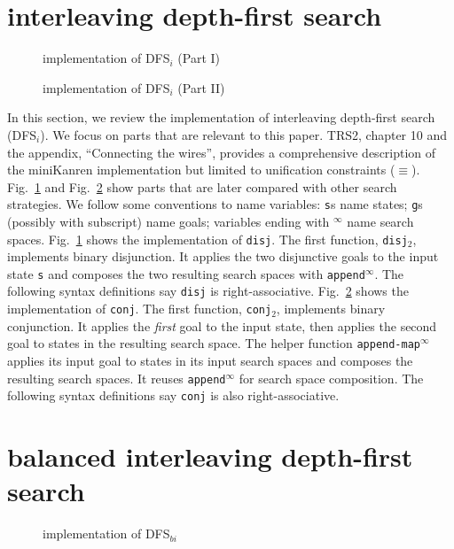 \documentclass[format=acmlarge, review=true, authordraft=true]{acmart}
\newcommand{\conj}{\texttt{conj}}
\newcommand{\disj}{\texttt{disj}}
\newcommand{\disjtwo}{\texttt{disj$_2$}}
\newcommand{\conjtwo}{\texttt{conj$_2$}}
\newcommand{\DFSi }[0]{DFS$_{i}$}
\newcommand{\DFSbi}[0]{DFS$_{bi}$}
\begin{document}
\section{interleaving depth-first search}

\begin{figure}
	
	\caption{implementation of \DFSi{} (Part I)}
	\label{DFSi-0}
\end{figure}

\begin{figure}
	
	\caption{implementation of \DFSi{} (Part II)}
	\label{DFSi-1}
\end{figure}

In this section, we review the implementation of interleaving depth-first 
search (\DFSi). We focus on parts that are relevant to this paper. TRS2,
chapter 10 and the appendix, ``Connecting the wires'', 
provides a comprehensive description of the 
miniKanren 
implementation but limited to unification constraints ($\equiv$).
Fig.~\ref{DFSi-0} and Fig.~\ref{DFSi-1} show parts that are later compared 
with other search 
strategies. We follow some conventions to name variables: \texttt{s}s name 
states; \texttt{g}s (possibly with subscript) name goals; 
variables ending with $^\infty$ name search spaces. Fig.~\ref{DFSi-0} shows the 
implementation of \disj. The 
first function, \disjtwo, implements binary disjunction. It applies the 
two disjunctive goals to the input state \texttt{s} and composes the two 
resulting search spaces with \texttt{append$^\infty$}. The following syntax 
definitions say \disj{} is right-associative. Fig.~\ref{DFSi-1} 
shows the implementation of \conj. The first function, \conjtwo{}, 
implements binary conjunction. 
It applies the \emph{first} goal to the input state, then applies the second 
goal to states in the resulting search space. The helper function 
\texttt{append-map$^\infty$} applies its input goal to states 
in its input search spaces and composes the resulting search spaces. It reuses 
\texttt{append$^\infty$} for search space composition. The following syntax 
definitions say \conj{} is also right-associative.

\section{balanced interleaving depth-first search}

\begin{figure}
	
	\caption{implementation of \DFSbi{}}
	\label{balanced-disj}
\end{figure}
\end{document}
